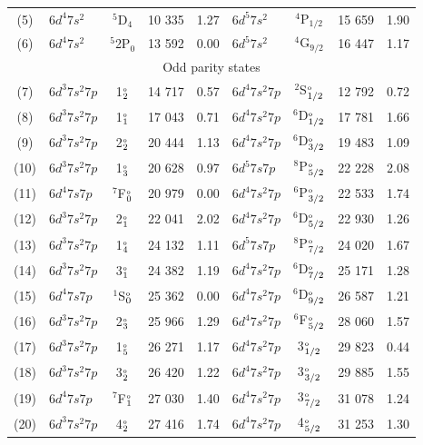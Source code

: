 \documentclass[8pt,a4paper, twoside]{report}
\begin{document}
\begin{table}[t]
\begin{tabular}{cl@{\hspace{0.5cm}}c@{\hspace{0.5cm}}r@{\hspace{0.5cm}}r@{\hspace{1cm}}l@{\hspace{0.5cm}}c@{\hspace{0.5cm}}r@{\hspace{0.5cm}}r}
 (5) &   $6d^4 7s^2$ &  $^5$D$_4$    & 10 335 & 1.27 &   $6d^5 7s^2$  &  $^4$P$_{1/2}$   &  15 659 & 1.90 \\ 
 (6) &  $6d^4 7s^2$ &  $^5$2P$_0$    & 13 592 & 0.00  &   $6d^5 7s^2$  &  $^4$G$_{9/2}$    & 16 447 & 1.17 \\  
\multicolumn{9}{c}{Odd parity states}\\
(7) &  $6d^3 7s^2 7p$  & 1$_2^{\rm_o}$    & 14 717 & 0.57  &   $6d^4 7s^2 7p $  &  $^2$S$_{1/2}^{\rm_o}$    & 12 792 & 0.72 \\  
(8) &   $6d^3 7s^2 7p$  &  1$_1^{\rm_o}$    & 17 043 & 0.71 &   $6d^4 7s^2 7p $   &  $^6$D$_{1/2}^{\rm_o}$   & 17 781 & 1.66 \\  
 (9) &  $6d^3 7s^2 7p$  & 2$_2^{\rm_o}$    & 20 444 & 1.13 &   $6d^4 7s^2 7p $   &  $^6$D$_{3/2}^{\rm_o}$    & 19 483 & 1.09 \\  
(10) &   $6d^3 7s^2 7p$  & 1$_3^{\rm_o}$    & 20 628 & 0.97  &   $6d^5 7s 7p$  &  $^8$P$_{5/2}^{\rm_o}$    & 22 228 & 2.08 \\  
(11) &  $6d^4 7s 7p$  &  $^7$F$_0^{\rm_o}$   & 20 979 & 0.00 &   $6d^4 7s^2 7p $   &  $^6$P$_{3/2}^{\rm_o}$    & 22 533 & 1.74 \\  
(12) &  $6d^3 7s^2 7p$  & 2$_1^{\rm_o}$     & 22 041 & 2.02  &   $6d^4 7s^2 7p $   &  $^6$D$_{5/2}^{\rm_o}$    & 22 930 & 1.26 \\  
 (13) &  $6d^3 7s^2 7p$  &  1$_4^{\rm_o}$   & 24 132 & 1.11 &   $6d^5 7s 7p$  &  $^8$P$_{7/2}^{\rm_o}$    & 24 020 & 1.67 \\ 
(14) &  $6d^3 7s^2 7p$  & 3$_1^{\rm_o}$    & 24 382 & 1.19  &   $6d^4 7s^2 7p $   &  $^6$D$_{7/2}^{\rm_o}$    & 25 171 & 1.28 \\  
(15) &  $6d^4 7s 7p$  &  $^1$S$_0^{\rm_o}$   & 25 362 & 0.00 &   $6d^4 7s^2 7p $   &  $^6$D$_{9/2}^{\rm_o}$    & 26 587 & 1.21 \\  
 (16) &  $6d^3 7s^2 7p$  & 2$_3^{\rm_o}$  & 25 966 & 1.29  &   $6d^4 7s^2 7p $  &  $^6$F$_{5/2}^{\rm_o}$    & 28 060 & 1.57 \\  
 (17) &  $6d^3 7s^2 7p$  &  1$_{5}^{\rm_o}$   & 26 271 & 1.17  &  $6d^4 7s^2 7p $  & 3$_{1/2}^{\rm_o}$  & 29 823 & 0.44 \\ 
(18) &   $6d^3 7s^2 7p$  & 3$_2^{\rm_o}$     & 26 420 & 1.22 &   $6d^4 7s^2 7p $ &  3$_{3/2}^{\rm_o}$  & 29 885 & 1.55 \\
(19) &  $6d^4 7s 7p$  &  $^7$F$_1^{\rm_o}$  & 27 030 & 1.40  &  $6d^4 7s^2 7p $  & 3$_{7/2}^{\rm_o}$  & 31 078 & 1.24 \\ 
(20) & $6d^3 7s^2 7p$  & 4$_2^{\rm_o}$   & 27 416 & 1.74  &   $6d^4 7s^2 7p $ & 4$_{5/2}^{\rm_o}$  & 31 253 & 1.30 \\ 

\end{tabular}
\end{table}
\end{document}
